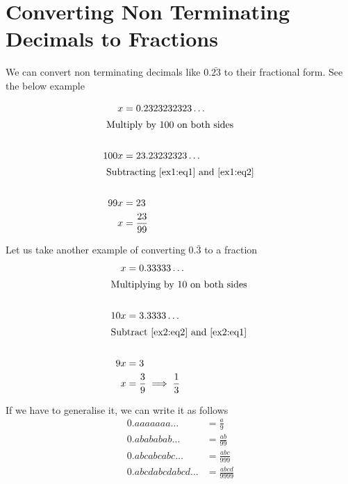 \section{Converting Non Terminating Decimals to Fractions}
We can convert non terminating decimals like $0.\bar{23}$ to their fractional form. See the below example

\begin{align}
    x &= 0.2323232323 \dots         \label{ex1:eq1} \\
    \shortintertext{ Multiply by 100 on both sides } \nonumber \\
    100x &= 23.23232323 \dots       \label{ex1:eq2} \\ 
    \shortintertext{ Subtracting \eqref{ex1:eq1} and \eqref{ex1:eq2} } \nonumber \\
    99x &= 23 \,  \nonumber \\
    x &= \displaystyle{ \frac{23}{99} } \nonumber
\end{align}

\vspace{1cm}

Let us take another example of converting $0.\bar{3}$ to a fraction
\begin{align}
    x &= 0.33333 \dots \label{ex2:eq1} \\
    \shortintertext{Multiplying by 10 on both sides} \nonumber \\ 
    10x &= 3.3333 \dots \label{ex2:eq2} \\
    \shortintertext{Subtract \eqref{ex2:eq2} and \eqref{ex2:eq1} } \nonumber \\
    9x &= 3 \nonumber \\
    x &= \displaystyle{ \frac{3}{9} \implies \frac{1}{3}} \nonumber 
\end{align}

\vspace{1cm}

If we have to generalise it, we can write it as follows 
\begin{align*}
    0.aaaaaaa \ldots &= \displaystyle{ \frac{a}{9} } \\
    0.abababab \ldots &= \displaystyle{ \frac{ab}{99} } \\
    0.abcabcabc \ldots &= \displaystyle{ \frac{abc}{999} } \\
    0.abcdabcdabcd \ldots &= \displaystyle{ \frac{abcd}{9999} }
\end{align*}


